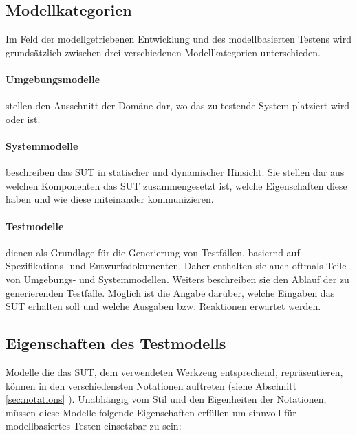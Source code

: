 \subsection{Modellkategorien}
Im Feld der modellgetriebenen Entwicklung und des modellbasierten Testens wird grundsätzlich zwischen drei verschiedenen Modellkategorien unterschieden.

\paragraph{Umgebungsmodelle} stellen den Ausschnitt der Domäne dar, wo das zu testende System platziert wird oder ist.
\paragraph{Systemmodelle} beschreiben das \Gls{SUT} in statischer und dynamischer Hinsicht. Sie stellen dar aus welchen Komponenten das \Gls{SUT} zusammengesetzt ist, welche Eigenschaften diese haben und wie diese miteinander kommunizieren. 
\paragraph{Testmodelle} dienen als Grundlage für die Generierung von Testfällen, basiernd auf Spezifikations- und Entwurfsdokumenten. Daher enthalten sie auch oftmals Teile von Umgebungs- und Systemmodellen. Weiters beschreiben sie den Ablauf der zu generierenden Testfälle. Möglich ist die Angabe darüber, welche Eingaben das \Gls{SUT} erhalten soll und welche Ausgaben bzw. Reaktionen erwartet werden.

\subsection{Eigenschaften des Testmodells} 
\label{sec:eigenschaften_modell}
Modelle die das \gls{SUT}, dem verwendeten Werkzeug entsprechend, repräsentieren, können in den verschiedensten Notationen auftreten (siehe Abschnitt \ref{sec:notations} ). Unabhängig vom Stil und den Eigenheiten der Notationen, müssen diese Modelle folgende Eigenschaften erfüllen um sinnvoll für modellbasiertes Testen einsetzbar zu sein:\\

